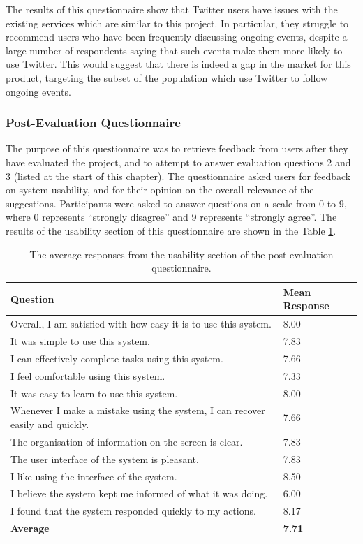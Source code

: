 \documentclass{l4proj}
\begin{document}
The results of this questionnaire show that Twitter users have issues with the existing services which are similar to this project. In particular, they struggle to recommend users who have been frequently discussing ongoing events, despite a large number of respondents saying that such events make them more likely to use Twitter. This would suggest that there is indeed a gap in the market for this product, targeting the subset of the population which use Twitter to follow ongoing events.
               
        \subsubsection{Post-Evaluation Questionnaire}
        The purpose of this questionnaire was to retrieve feedback from users after they have evaluated the project, and to attempt to answer evaluation questions 2 and 3 (listed at the start of this chapter). The questionnaire asked users for feedback on system usability, and for their opinion on the overall relevance of the suggestions. Participants were asked to answer questions on a scale from 0 to 9, where 0 represents ``strongly disagree'' and 9 represents ``strongly agree''. The results of the usability section of this questionnaire are shown in the Table \ref{table:posteval}.
        
\begin{table}[H]
    \centering
    \begin{tabular}{| l | l |}
    \hline
    Question & Mean Response \\ \hline
    Overall, I am satisfied with how easy it is to use this system. & 8.00 \\ \hline
    It was simple to use this system. & 7.83 \\ \hline
    I can effectively complete tasks using this system. &  7.66 \\ \hline
    I feel comfortable using this system. & 7.33 \\ \hline
    It was easy to learn to use this system. & 8.00 \\ \hline
    Whenever I make a mistake using the system, I can recover easily and quickly. & 7.66 \\ \hline
    The organisation of information on the screen is clear. & 7.83  \\ \hline
    The user interface of the system is pleasant. & 7.83  \\ \hline
    I like using the interface of the system. & 8.50  \\ \hline
    I believe the system kept me informed of what it was doing. & 6.00 \\ \hline
    I found that the system responded quickly to my actions. & 8.17  \\ \hline
    \textbf{Average} & \textbf{7.71} \\
    \hline
    \end{tabular}
    \caption{\label{table:posteval}The average responses from the usability section of the post-evaluation questionnaire.}
\end{table}
\end{document}
